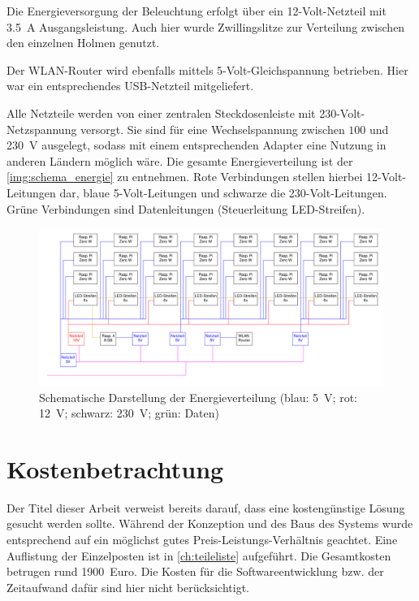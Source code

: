 \documentclass[./00PhotoBox.tex]{subfiles}
\begin{document}
Die Energieversorgung der Beleuchtung erfolgt über ein 12-Volt-Netzteil mit \SI{3,5}{\ampere} Ausgangsleistung. Auch hier wurde Zwillingslitze zur Verteilung zwischen den einzelnen Holmen genutzt.

Der WLAN-Router wird ebenfalls mittels 5-Volt-Gleichspannung betrieben. Hier war ein entsprechendes USB-Netzteil mitgeliefert.

Alle Netzteile werden von einer zentralen Steckdosenleiste mit 230-Volt-Netzspannung versorgt. Sie sind für eine Wechselspannung zwischen $100$ und \SI{230}{\volt} ausgelegt, sodass mit einem entsprechenden Adapter eine Nutzung in anderen Ländern möglich wäre. Die gesamte Energieverteilung ist der \autoref{img:schema_energie} zu entnehmen. Rote Verbindungen stellen hierbei 12-Volt-Leitungen dar, blaue 5-Volt-Leitungen und schwarze die 230-Volt-Leitungen. Grüne Verbindungen sind Datenleitungen (Steuerleitung LED-Streifen).

\begin{figure}[htbp]
    \centering
    \includegraphics[width=1.0\textwidth]{./img/uml/uml_energie.pdf}
    \caption{Schematische Darstellung der Energieverteilung (blau: \SI{5}{\volt}; rot: \SI{12}{\volt}; schwarz: \SI{230}{\volt}; grün: Daten)}
    \label{img:schema_energie}
\end{figure}


\section{Kostenbetrachtung}
Der Titel dieser Arbeit verweist bereits darauf, dass eine kostengünstige Lösung gesucht werden sollte. Während der Konzeption und des Baus des Systems wurde entsprechend auf ein möglichst gutes Preis-Leistungs-Verhältnis geachtet. Eine Auflistung der Einzelposten ist in \autoref{ch:teileliste} aufgeführt. Die Gesamtkosten betrugen rund \SI{1900}{Euro}. Die Kosten für die Softwareentwicklung bzw. der Zeitaufwand dafür sind hier nicht berücksichtigt.
\end{document}
